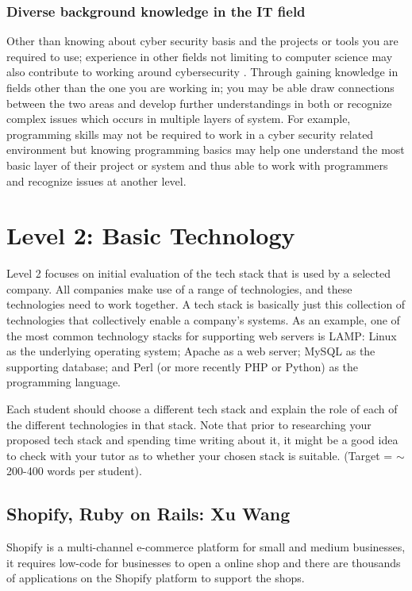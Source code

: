 \documentclass[a4paper, 11pt]{report}
\begin{document}
\subsubsection{Diverse background knowledge in the IT field}
Other than knowing about cyber security basis and the projects or tools you are required to use; experience in other fields not limiting to computer science may also contribute to working around cybersecurity \cite{dawson2018future}. Through gaining knowledge in fields other than the one you are working in; you may be able draw connections between the two areas and develop further understandings in both or recognize complex issues which occurs in multiple layers of system. For example, programming skills may not be required to work in a cyber security related environment but knowing programming basics may help one understand the most basic layer of their project or system and thus able to work with programmers and recognize issues at another level.  




\newpage
\section{Level 2: Basic Technology}

Level 2 focuses on initial evaluation of the tech stack that is used by a selected company. All companies make use of a range of technologies, and these technologies need to work together. A tech stack is basically just this collection of technologies that collectively enable a company's systems. As an example, one of the most common technology stacks for supporting web servers is LAMP: Linux as the underlying operating system; Apache as a web server; MySQL as the supporting database; and Perl (or more recently PHP or Python) as the programming language.

Each student should choose a different tech stack and explain the role of each of the different technologies in that stack. Note that prior to researching your proposed tech stack and spending time writing about it, it might be a good idea to check with your tutor as to whether your chosen stack is suitable. (Target = $\sim$200-400 words per student).

\subsection{Shopify, Ruby on Rails: Xu Wang}
\indent Shopify is a multi-channel e-commerce platform for small and medium businesses, it requires low-code for businesses to open a online shop and there are thousands of applications on the Shopify platform to support the shops.
\end{document}
